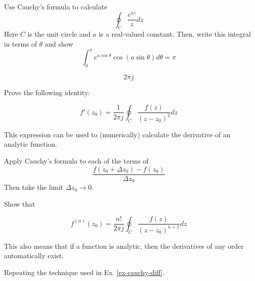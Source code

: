 \begin{exer}
Use Cauchy's formula to calculate 
$$\oint_{{C}}  \frac {e^{az}} {z} dz$$
Here ${C}$ is the unit circle and $a$ is a real-valued constant. Then, write this integral in terms of $\theta$ and show
$$ \int_0^\pi e ^{a \cos \theta} \cos (a \sin \theta) d\theta = \pi $$
\begin{sol}
$$2 \pi j$$
\end{sol}
\end{exer}

\begin{exer}
\label{ex-cauchy-diff}
Prove the following identity:

$$f'(z_0)=\frac{1}{2 \pi j} \oint_{{C}} \frac{f(z)} {(z-z_0)^2} dz$$

This expression can be used to (numerically) calculate the derivative of an analytic function.
\begin{hnt}
Apply Cauchy's formula to each of the terms of $$\frac{f(z_0+\Delta z_0) - f(z_0)}{\Delta z_0}$$ Then take the limit ${\Delta z_0} \to 0$.
\end{hnt}
\end{exer}

\begin{exer}
Show that

  $$f^{(n)}(z_0)=\frac{n!}{2 \pi j} \oint_{{C}} \frac{f(z)} {(z-z_0)^{n+1}} dz$$
  
This also means that if a function is analytic, then the derivatives of any order automatically exist.
\begin{hnt}
Repeating the technique used in Ex. \ref{ex-cauchy-diff}.
\end{hnt}  
\end{exer}


\pagebreak




